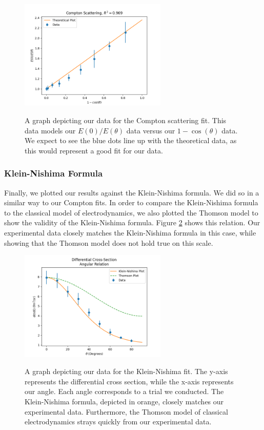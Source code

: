 \documentclass[10pt,letterpaper,onecolumn]{article}
\begin{document}
\begin{figure}[hbt!]
    \begin{center}
        {{\includegraphics[width=7cm]{R2Compton.png} }}%
        \caption{A graph depicting our data for the Compton scattering fit. This data models our $E(0)/E(\theta)$ data versus our $1 - \cos(\theta)$ data. We expect to see the blue dots line up with the theoretical data, as this would represent a good fit for our data.}%
        \label{fig:r2}%
    \end{center}
\end{figure}

\subsubsection*{Klein-Nishima Formula}
Finally, we plotted our results against the Klein-Nishima formula. We did so in a similar way to our Compton fits. In order to compare the Klein-Nishima formula to the classical model of electrodynamics, we also plotted the Thomson model to show the validity of the Klein-Nishima formula. Figure \ref{fig:kn} shows this relation. Our experimental data closely matches the Klein-Nishima formula in this case, while showing that the Thomson model does not hold true on this scale.
\begin{figure}[hbt!]
    \begin{center}
        {{\includegraphics[width=7cm]{KNvsT.png} }}%
        \caption{A graph depicting our data for the Klein-Nishima fit. The y-axis represents the differential cross section, while the x-axis represents our angle. Each angle corresponds to a trial we conducted. The Klein-Nishima formula, depicted in orange, closely matches our experimental data. Furthermore, the Thomson model of classical electrodynamics strays quickly from our experimental data.}%
        \label{fig:kn}%
    \end{center}
\end{figure}
\end{document}
